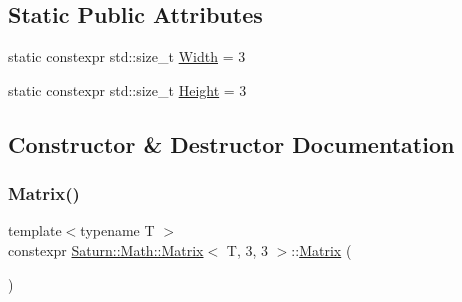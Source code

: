 \subsection*{Static Public Attributes}
\begin{DoxyCompactItemize}
\item 
static constexpr std\+::size\+\_\+t \mbox{\hyperlink{class_saturn_1_1_math_1_1_matrix_3_01_t_00_013_00_013_01_4_a7df732e9641685e8dbbff6f06c6eedab}{Width}} = 3
\item 
static constexpr std\+::size\+\_\+t \mbox{\hyperlink{class_saturn_1_1_math_1_1_matrix_3_01_t_00_013_00_013_01_4_a6aaca5d7ab1d60b436c7f8076d2c8b06}{Height}} = 3
\end{DoxyCompactItemize}


\subsection{Constructor \& Destructor Documentation}
\mbox{\label{class_saturn_1_1_math_1_1_matrix_3_01_t_00_013_00_013_01_4_a0ab2d3c41caf7d097a78aff95b811f7b}} 
\subsubsection{\texorpdfstring{Matrix()}{Matrix()}\hspace{0.1cm}{\footnotesize\ttfamily [1/4]}}
{\footnotesize\ttfamily template$<$typename T $>$ \\
constexpr \mbox{\hyperlink{class_saturn_1_1_math_1_1_matrix}{Saturn\+::\+Math\+::\+Matrix}}$<$ T, 3, 3 $>$\+::\mbox{\hyperlink{class_saturn_1_1_math_1_1_matrix}{Matrix}} (\begin{DoxyParamCaption}{ }\end{DoxyParamCaption})\hspace{0.3cm}{\ttfamily [inline]}}

\mbox{\label{class_saturn_1_1_math_1_1_matrix_3_01_t_00_013_00_013_01_4_ab71b1f5b9ed7f43c82cc07c205bce57c}} 
